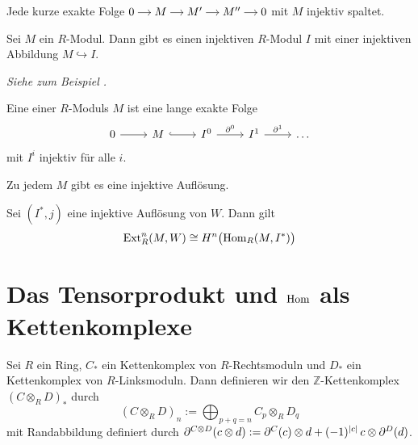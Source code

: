 \begin{bemerkung}[{name=[{kurze exakte mit injektivem Modul an der ersten Stelle}]}]
	Jede kurze exakte Folge \(
		\begin{tikzcd}[cramped,sep=small]
			0 \rar & M \rar & M' \rar & M'' \rar & 0
		\end{tikzcd}
	\)
	mit $M$ injektiv spaltet.
\end{bemerkung}

\begin{satz}[{name=[Existenz von injektiven Moduln]}]
	Sei $M$ ein $R$-Modul.
	Dann gibt es einen injektiven $R$-Modul $I$ mit einer injektiven Abbildung $M \hookrightarrow I$.
\end{satz}
\begin{beweis}
	\emph{Siehe zum Beispiel \cite[Satz~5.5.3]{Kasch}.}
\end{beweis}

\begin{definition}[{name=[{injektive Auflösung}]}]
	Eine  einer $R$-Moduls $M$ ist eine lange exakte Folge 
	\[
		\begin{tikzcd}
			0 \rar & M \rar[hook] & I^0 \rar["\partial^0"] & I^1 \rar["\partial^1"] & \ldots 
		\end{tikzcd}
	\]
	mit $I^i$ injektiv für alle $i$.
\end{definition}

\begin{korollarB}[{name=[{Existenz von injektiven Auflösungen}]}]
	Zu jedem $M$ gibt es eine injektive Auflösung.
\end{korollarB}

\begin{bemerkung}[{name=[{Ext mittels injektiver Auflösung}]}]
	Sei $(I^*,j)$ eine injektive Auflösung von $W$. 
	Dann gilt
	\[
		\Ext_R^n(M,W) \cong H^n \enbrace[\big]{\Hom_R(M,I^*)}
	\]
\end{bemerkung}
\newpage

\section[Das Tensorprodukt und Hom als Kettenkomplexe]{Das Tensorprodukt und $\Hom$ als Kettenkomplexe} %
\label{sec:13}

\begin{definition}[{name=[{Tensorprodukt von Kettenkomplexen}]}]
	Sei $R$ ein Ring, $C_*$ ein Kettenkomplex von $R$-Rechtsmoduln und $D_*$ ein Kettenkomplex von $R$-Linksmoduln.
	Dann definieren wir den $\mathbb{Z}$-Kettenkomplex $(C \otimes_R D)_*$ durch 
	\[
		(C \otimes_R D)_n := \bigoplus_{p+q=n} C_p \otimes_R D_q
	\]
	mit Randabbildung definiert durch
	\(
		\partial^{C \otimes D} (c \otimes d) := \partial^C(c) \otimes d + (-1)^{\abs*{c}}\, c \otimes \partial^D(d)
	\).
\end{definition}

